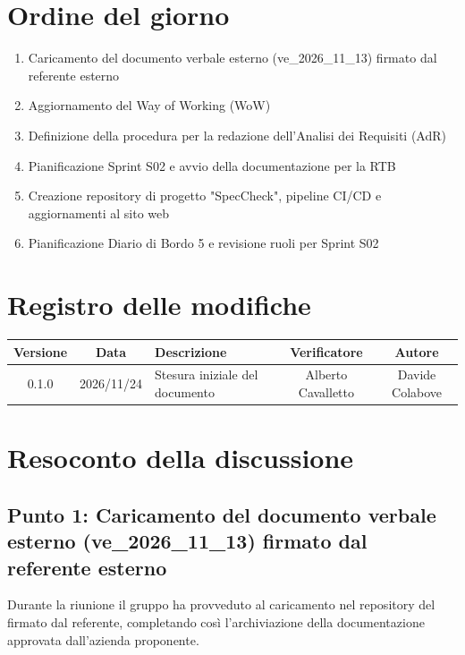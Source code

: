 \documentclass[a4paper, 11pt]{article}
\begin{document}
\section*{Ordine del giorno}
\begin{enumerate}
    \item Caricamento del documento verbale esterno (ve\_2026\_11\_13) firmato dal referente esterno\vspace{-0.2cm}
    \item Aggiornamento del Way of Working (WoW)\vspace{-0.2cm}
    \item Definizione della procedura per la redazione dell'Analisi dei Requisiti (AdR)\vspace{-0.2cm}
    \item Pianificazione Sprint S02 e avvio della documentazione per la RTB\vspace{-0.2cm}
    \item Creazione repository di progetto "SpecCheck", pipeline CI/CD e aggiornamenti al sito web\vspace{-0.2cm}
    \item Pianificazione Diario di Bordo 5 e revisione ruoli per Sprint S02
\end{enumerate}
\vspace{-0.5cm}

\section*{Registro delle modifiche}
\begin{tabularx}{\textwidth}{|c|c|X|c|c|}
    \hline
    \textbf{Versione} & \textbf{Data} & \textbf{Descrizione} & \textbf{Verificatore} & \textbf{Autore} \\ \hline
    0.1.0 & 2026/11/24 & Stesura iniziale del documento & Alberto Cavalletto & Davide Colabove \\ \hline
\end{tabularx}

\newpage
\tableofcontents
\newpage


\section{Resoconto della discussione}

\subsection{Punto 1: Caricamento del documento verbale esterno (ve\_2026\_11\_13) firmato dal referente esterno} \label{PuntoUno}
Durante la riunione il gruppo ha provveduto al caricamento nel repository del  firmato dal referente, completando così l'archiviazione della documentazione approvata dall'azienda proponente.
\end{document}
